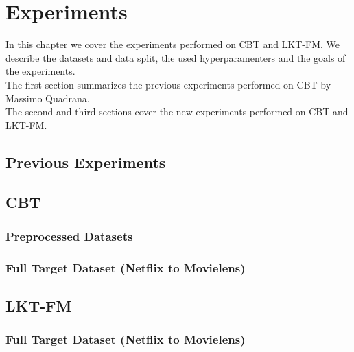 \chapter{Experiments}
\label{ch:experiments}

In this chapter we cover the experiments performed on CBT and LKT-FM. We describe the datasets and data split, the used hyperparamenters and the goals of the experiments.\\
The first section summarizes the previous experiments performed on CBT by Massimo Quadrana.\\
The second and third sections cover the new experiments performed on CBT and LKT-FM.



\section{Previous Experiments}



\section{CBT}


\subsection{Preprocessed Datasets}


\subsection{Full Target Dataset (Netflix to Movielens)}



\section{LKT-FM}


\subsection{Full Target Dataset (Netflix to Movielens)}